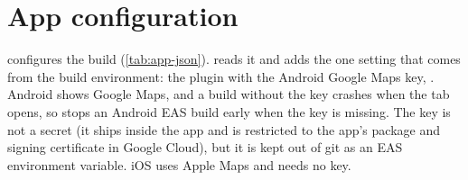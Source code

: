 \section{App configuration}

 configures the build (\cref{tab:app-json}).  reads it and adds
the one setting that comes from the build environment: the  plugin with the
Android Google Maps key, . Android shows Google Maps, and a build
without the key crashes when the  tab opens, so  stops an Android EAS build
early when the key is missing. The key is not a secret (it ships inside the app and is restricted to
the app's package and signing certificate in Google Cloud), but it is kept out of git as an EAS
environment variable. iOS uses Apple Maps and needs no key.

